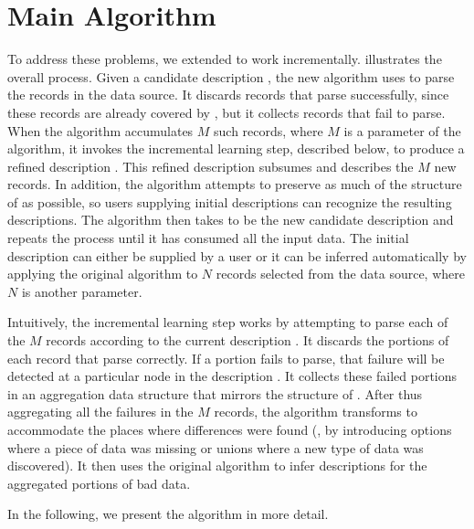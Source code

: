 \section{Main Algorithm}\label{sec:algo}

To address these problems, we extended \learnpads{} to work
incrementally.  
 illustrates the overall process.
Given a candidate description , the new algorithm uses  to parse
the records in the data source.  
It discards records that parse successfully, since these records are
already covered by , but it collects records that fail to parse.
When the algorithm accumulates $M$ such records, where $M$ is a
parameter of the algorithm, it invokes the incremental learning step,
described below, to produce a refined description .  This refined
description subsumes  and describes the $M$
new records.  In addition, the algorithm attempts to preserve as much
of the structure of  as possible, so users supplying initial
descriptions can recognize the resulting descriptions. 
The algorithm then takes 
to be the new candidate description and repeats the process until it
has consumed all the input data.
The initial description  can either be supplied by a user or it
can be inferred automatically by applying the original algorithm to
$N$ records selected from the data source, where $N$ is another
parameter.  


Intuitively, the incremental learning step works by attempting to
parse each of the $M$ records according to the current description
.  It discards the portions of each record that parse correctly.
If a portion fails to parse, that failure will be detected at a
particular node in the description . It collects these failed
portions in an aggregation data structure  that mirrors the
structure of .  After thus aggregating all the failures in the $M$
records, the algorithm transforms  to accommodate the places where
differences were found (\ie, by introducing options where a piece of
data was missing or unions where a new type of data was discovered).
It then uses the original \learnpads{} algorithm to infer descriptions
for the aggregated portions of bad data. 

In the following, we present the algorithm in more detail.

